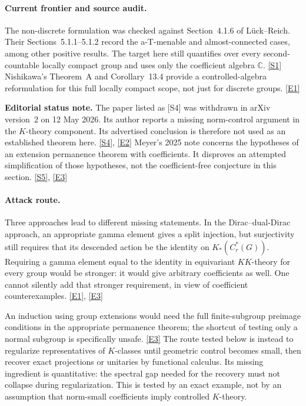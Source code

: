\documentclass[11pt]{article}
\newcommand{\C}{\mathbb{C}}
\newcommand{\sref}[2]{\hyperlink{source:#1:#2}{[S#2]}}
\newcommand{\eref}[2]{\hyperlink{extra:#1:#2}{[E#2]}}
\begin{document}
\paragraph{Current frontier and source audit.}
The non-discrete formulation was checked against Section~4.1.6 of
L\"uck--Reich. Their Sections~5.1.1--5.1.2 record the a-T-menable and
almost-connected cases, among other positive results. The target here
still quantifies over every second-countable locally compact group and
uses only the coefficient algebra $\C$. \sref{53}{1}
Nishikawa's Theorem~A and Corollary~13.4 provide a controlled-algebra
reformulation for this full locally compact scope, not just for discrete
groups. \eref{53}{1}

\textbf{Editorial status note.} The paper listed as [S4] was withdrawn
in arXiv version~2 on 12 May 2026. Its author reports a missing norm-control
argument in the $K$-theory component. Its advertised conclusion is
therefore not used as an established theorem here. \sref{53}{4},
\eref{53}{2}
Meyer's 2025 note concerns the hypotheses of an extension permanence
theorem with coefficients. It disproves an attempted simplification of
those hypotheses, not the coefficient-free conjecture in this section.
\sref{53}{5}, \eref{53}{3}

\paragraph{Attack route.}
Three approaches lead to different missing statements. In the
Dirac--dual-Dirac approach, an appropriate gamma element gives a split
injection, but surjectivity still requires that its descended action be
the identity on $K_*(C_r^*(G))$. Requiring a gamma element equal to the
identity in equivariant $KK$-theory for every group would be stronger:
it would give arbitrary coefficients as well. One cannot silently add
that stronger requirement, in view of coefficient counterexamples.
\eref{53}{1}, \eref{53}{3}

An induction using group extensions would need the full finite-subgroup
preimage conditions in the appropriate permanence theorem; the shortcut
of testing only a normal subgroup is specifically unsafe. \eref{53}{3}
The route tested below is instead to regularize representatives of
$K$-classes until geometric control becomes small, then recover exact
projections or unitaries by functional calculus. Its missing ingredient
is quantitative: the spectral gap needed for the recovery must not
collapse during regularization. This is tested by an exact example, not
by an assumption that norm-small coefficients imply controlled
$K$-theory.
\end{document}
